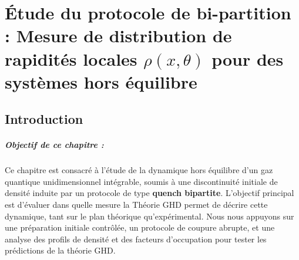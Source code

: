 \chapter{Étude du protocole de bi-partition : Mesure de distribution de rapidités locales $\rho(x , \theta ) $  pour des systèmes hors équilibre}\label{chap:bipartite}
\minitoc


\section*{Introduction}


\paragraph*{Objectif de ce chapitre :}
Ce chapitre est consacré à l’étude de la dynamique hors équilibre d’un gaz quantique unidimensionnel intégrable, soumis à une discontinuité initiale de densité induite par un protocole de type {\bf quench bipartite}. L’objectif principal est d’évaluer dans quelle mesure la Théorie \gls{GHD} permet de décrire cette dynamique, tant sur le plan théorique qu’expérimental. Nous nous appuyons sur une préparation initiale contrôlée, un protocole de coupure abrupte, et une analyse des profils de densité et des facteurs d’occupation pour tester les prédictions de la théorie \gls{GHD}.



